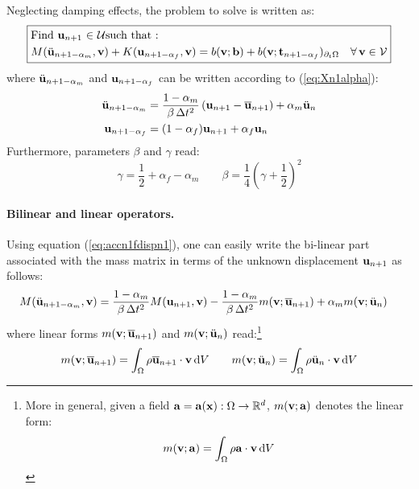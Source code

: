 Neglecting damping effects, the problem to solve is written as:
\begin{equation}
\boxed{\begin{aligned} & \text{Find}~{{\bf{u}}_{n+1}~{\in}~{\mathcal{U}}} \text{such that : }\\
 & M(\ddot{{\bf{u}}}_{n+1-\alpha_{m}},{\bf{v}})+K({\bf{u}}_{n+1-\alpha_{f}},{\bf{v}})=b({\bf{v}};{\bf{b}})+b({\bf{v}};{\bf t}_{n+1-\alpha_{f}})_{\partial_{t}\Omega}\quad{{\forall\,}}{\bf{v}}\in\mathcal{V}
\end{aligned}
}
\end{equation}
where $\ddot{{\bf{u}}}_{n+1-\alpha_{m}}$ and ${\bf{u}}_{n+1-\alpha_{f}}$ can
be written according to (\ref{eq:Xn1alpha}):
\begin{equation}
\begin{aligned}\ddot{{\bf{u}}}_{n+1-\alpha_{m}} & =\frac{1-\alpha_{m}}{\beta\,\Delta t^{2}}\left({\bf{u}}_{n+1}-\overline{{\bf{u}}}_{n+1}\right)+\alpha_{m}\ddot{{\bf{u}}}_{n}\\
{\bf{u}}_{n+1-\alpha_{f}} & =(1-\alpha_{f}){\bf{u}}_{n+1}+\alpha_{f}{\bf{u}}_{n}
\end{aligned}
\label{eq:accn1fdispn1-1}
\end{equation}
Furthermore, parameters $\beta$ and $\gamma$ read:
\begin{equation}
    \gamma = \frac{1}{2}+ \alpha_f - \alpha_m \qquad \beta = \frac{1}{4} \left( \gamma + \frac{1}{2}\right)^2
\end{equation}

\paragraph{Bilinear and linear operators.}

Using equation (\ref{eq:accn1fdispn1}), one can easily write the
bi-linear part associated with the mass matrix in terms of the unknown
displacement ${\bf{u}}_{n+1}$ as follows:
\begin{equation}
\begin{aligned}M(\ddot{{\bf{u}}}_{n+1-\alpha_{m}},{\bf{v}}) & =\frac{1-\alpha_{m}}{\beta\,\Delta t^{2}}M({\bf{u}}_{n+1},{\bf{v}})-\frac{1-\alpha_{m}}{\beta\,\Delta t^{2}}m({\bf{v}};\overline{{\bf{u}}}_{n+1})+\alpha_{m}m({\bf{v}};\ddot{{\bf{u}}}_{n})\end{aligned}
\label{eq:M_1}
\end{equation}
where linear forms $m({\bf{v}};\overline{{\bf{u}}}_{n+1})$ and $m({\bf{v}};\ddot{{\bf{u}}}_{n})$
read:\footnote{More in general, given a field ${\bf{a}}={\bf{a}}({\bf{x}}):\Omega\to\mathbb{R}^{d}$,
$m({\bf{v}};{\bf{a}})$ denotes the linear form:
\begin{equation}
m({\bf{v}};{\bf{a}})=\int_{\Omega}\rho{\bf{a}}\cdot{\bf{v}}\,{\rm d}V
\end{equation}}
\begin{equation}
m({\bf{v}};\overline{{\bf{u}}}_{n+1})=\int_{\Omega}\rho\overline{{\bf{u}}}_{n+1}\cdot{\bf{v}}\,{\rm d}V\qquad m({\bf{v}};\ddot{{\bf{u}}}_{n})=\int_{\Omega}\rho\ddot{{\bf{u}}}_{n}\cdot{\bf{v}}\,{\rm d}V
\end{equation}

